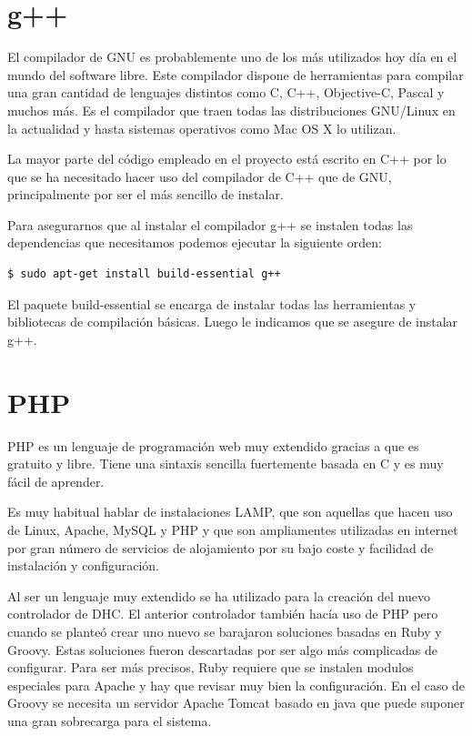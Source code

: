 \section{g++}

El compilador de GNU es probablemente uno de los más utilizados hoy día en el mundo del software libre. Este compilador dispone de herramientas para compilar una gran cantidad de lenguajes distintos como C, C++, Objective-C, Pascal y muchos más. Es el compilador que traen todas las distribuciones GNU/Linux en la actualidad y hasta sistemas operativos como Mac OS X lo utilizan.

La mayor parte del código empleado en el proyecto está escrito en C++ por lo que se ha necesitado hacer uso del compilador de C++ que de GNU, principalmente por ser el más sencillo de instalar.

Para asegurarnos que al instalar el compilador g++ se instalen todas las dependencias que necesitamos podemos ejecutar la siguiente orden:

\begin{verbatim}
$ sudo apt-get install build-essential g++
\end{verbatim}

El paquete build-essential se encarga de instalar todas las herramientas y bibliotecas de compilación básicas. Luego le indicamos que se asegure de instalar g++.

\section{PHP}

PHP es un lenguaje de programación web muy extendido gracias a que es gratuito y libre. Tiene una sintaxis sencilla fuertemente basada en C y es muy fácil de aprender.

Es muy habitual hablar de instalaciones LAMP, que son aquellas que hacen uso de Linux, Apache, MySQL y PHP y que son ampliamentes utilizadas en internet por gran número de servicios de alojamiento por su bajo coste y facilidad de instalación y configuración.

Al ser un lenguaje muy extendido se ha utilizado para la creación del nuevo controlador de DHC. El anterior controlador también hacía uso de PHP pero cuando se planteó crear uno nuevo se barajaron soluciones basadas en Ruby y Groovy. Estas soluciones fueron descartadas por ser algo más complicadas de configurar. Para ser más precisos, Ruby requiere que se instalen modulos especiales para Apache y hay que revisar muy bien la configuración. En el caso de Groovy se necesita un servidor Apache Tomcat basado en java que puede suponer una gran sobrecarga para el sistema.

